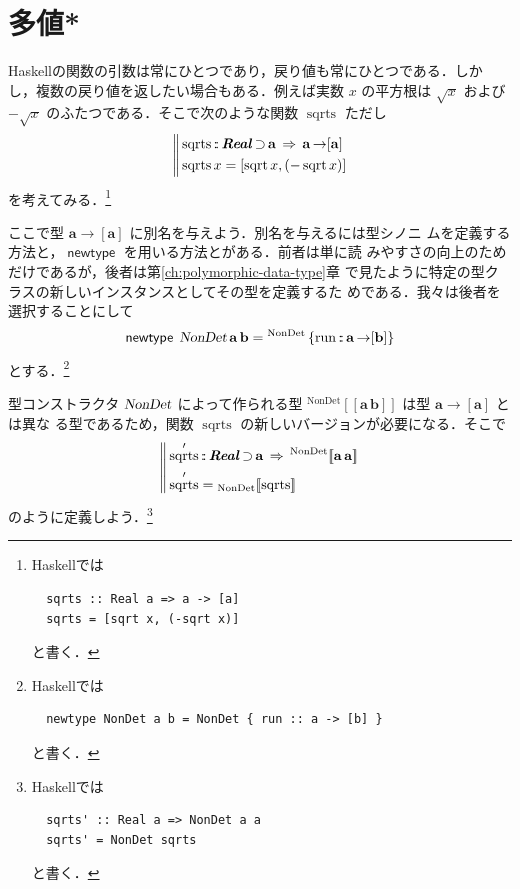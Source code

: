 \documentclass[a5paper,twoside,fleqn,draft]{jsbook}
\def\[{[\![}
\def\]{]\!]}
\newcommand{\programminglanguage}[1]{\textsf{#1}}
\newcommand{\haskell}{\programminglanguage{Haskell}}
\newcommand{\mBrace}{\Vert}
\newcommand{\mKeyword}[1]{\mathsf{#1}}
\newcommand{\mNewTypeDeclKeyword}{\mKeyword{newtype}}
\DeclareMathOperator{\mNewTypeDecl}{\mNewTypeDeclKeyword}
\DeclareMathOperator{\mSuperClass}{\;\Rightarrow\;}
\DeclareMathOperator{\mSuperSet}{\supset}
\newcommand{\mSpecialFunc}[1]{\mathrm{#1}}
\DeclareMathOperator{\mRun}{\mSpecialFunc{run}}
\DeclareMathOperator{\mSqrt}{\mSpecialFunc{sqrt}}
\DeclareMathOperator{\mSqrts}{\mSpecialFunc{sqrts}}
\DeclareMathOperator{\mFuncArrow}{\rightarrow}
\DeclareMathOperator{\mIn}{{:\!:}}
\newcommand{\mType}[1]{\mathbf{#1}} %
\newcommand{\mA}{\mType{a}}
\newcommand{\mB}{\mType{b}}
\newcommand{\mTypeAssemble}[2]{{}^\mathrm{#1}\[\mType{#2}\]}
\newcommand{\mTypeConstructor}[1]{\textsl{#1}}
\newcommand{\mValueConstructor}[1]{\mathrm{#1}}
\newcommand{\mValueWith}[2]{{}_\mValueConstructor{#1}\[#2\]}
\newcommand{\mValueRecordBeginWith}[1]{{}^\mValueConstructor{#1}\,\{}
\newcommand{\mValueRecordEnd}{\}}
\newcommand{\mValueRecordWith}[2]{\mValueRecordBeginWith{#1}{#2}\mValueRecordEnd}
\newcommand{\mTypeClass}[1]{\textbf{\textit{#1}}}
\newcommand{\mRealTypeClass}{\mTypeClass{Real}}
\begin{document}
\section{多値*}

\haskell の関数の引数は常にひとつであり，戻り値も常にひとつである．しか
し，複数の戻り値を返したい場合もある．例えば実数 $x$ の平方根は
$\sqrt{x}$ および $-\sqrt{x}$ のふたつである．そこで次のような関数
$\mSqrts$ ただし
\begin{equation}
  \left\mBrace
  \begin{aligned}
    &\mSqrts\mIn{}\mRealTypeClass\mSuperSet\mA \mSuperClass
    \mA\mFuncArrow[\mA]\\
    &\mSqrts x=[\mSqrt x,(-\mSqrt x)]
  \end{aligned}
  \right.
\end{equation}
を考えてみる．\footnote{\haskell では
\begin{verbatim}
  sqrts :: Real a => a -> [a]
  sqrts = [sqrt x, (-sqrt x)]
\end{verbatim}
と書く．}

ここで型 $\mA\mFuncArrow[\mA]$ に別名を与えよう．別名を与えるには型シノニ
ムを定義する方法と，$\mNewTypeDecl$ を用いる方法とがある．前者は単に読
みやすさの向上のためだけであるが，後者は第\ref{ch:polymorphic-data-type}章
で見たように特定の型クラスの新しいインスタンスとしてその型を定義するた
めである．我々は後者を選択することにして
\begin{equation}
  \mNewTypeDecl\;
  \mTypeConstructor{NonDet}\,\mA\,\mB
  =\mValueRecordWith{NonDet}{\mRun\mIn\mA\mFuncArrow[\mB]}
\end{equation}
とする．\footnote{\haskell では
\begin{verbatim}
  newtype NonDet a b = NonDet { run :: a -> [b] }
\end{verbatim}
と書く．}

型コンストラクタ $\mTypeConstructor{NonDet}$ によって作られる型
$\mTypeAssemble{NonDet}{\mA\,\mB}$ は型 $\mA\mFuncArrow[\mA]$ とは異な
る型であるため，関数 $\mSqrts$ の新しいバージョンが必要になる．そこで
\begin{equation}
  \left\mBrace
  \begin{aligned}
    &\mSqrts'
    \mIn\mRealTypeClass\mSuperSet\mA
    \mSuperClass\mTypeAssemble{NonDet}{\mA\,\mA}\\
    &\mSqrts'
    =\mValueWith{NonDet}{\mSqrts}
  \end{aligned}
  \right.
\end{equation}
のように定義しよう．\footnote{\haskell では
\begin{verbatim}
  sqrts' :: Real a => NonDet a a
  sqrts' = NonDet sqrts
\end{verbatim}
と書く．}
\end{document}

